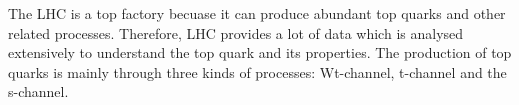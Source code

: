 The LHC is a top factory becuase it can produce abundant top quarks and other related processes.
Therefore, LHC provides a lot of data which is analysed extensively to understand the top quark and
its properties. The production of top quarks is mainly through three kinds of processes: Wt-channel,
t-channel and the s-channel.









